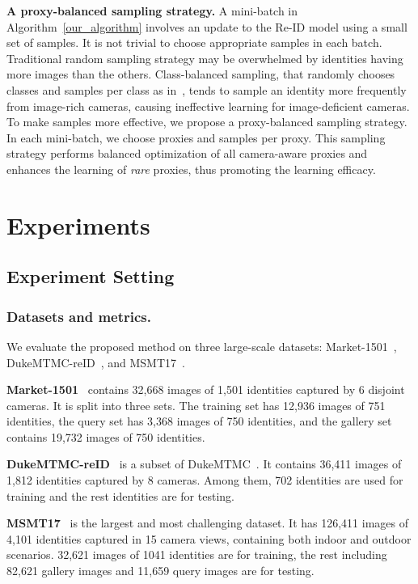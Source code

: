 \documentclass[letterpaper]{article} \usepackage{aaai21}  \usepackage{times}  \usepackage{helvet} \usepackage{courier}  \usepackage[hyphens]{url}  \usepackage{graphicx} \usepackage{subcaption}
\begin{document}
\textbf{A proxy-balanced sampling strategy.} A mini-batch in Algorithm~\ref{our_algorithm} involves an update to the Re-ID model using a small set of samples. It is not trivial to choose appropriate samples in each batch. Traditional random sampling strategy may be overwhelmed by identities having more images than the others. Class-balanced sampling, that randomly chooses  classes and  samples per class as in~\cite{hermans2017defense}, tends to sample an identity more frequently from image-rich cameras, causing ineffective learning for image-deficient cameras. To make samples more effective, we propose a proxy-balanced sampling strategy. In each mini-batch, we choose  proxies and  samples per proxy. This sampling strategy performs balanced optimization of all camera-aware proxies and enhances the learning of \textit{rare} proxies, thus promoting the learning efficacy.



\section{Experiments}
\subsection{Experiment Setting}
\subsubsection{Datasets and metrics.} 
We evaluate the proposed method on three large-scale datasets: Market-1501~\cite{7410490}, DukeMTMC-reID~\cite{zheng2017unlabeled}, and MSMT17~\cite{wei2018person}. 

\textbf{Market-1501}~\cite{7410490} contains 32,668 images of 1,501 identities captured by 6 disjoint cameras. It is split into three sets. The training set has 12,936 images of 751 identities, the query set has 3,368 images of 750 identities, and the gallery set contains 19,732 images of 750 identities. 

\textbf{DukeMTMC-reID}~\cite{zheng2017unlabeled} is a subset of DukeMTMC~\cite{ristani2016performance}. It contains 36,411 images of 1,812 identities captured by 8 cameras. Among them, 702 identities are used for training and the rest identities are for testing. 

\textbf{MSMT17}~\cite{wei2018person} is the largest and most challenging dataset. It has 126,411 images of 4,101 identities captured in 15 camera views, containing both indoor and outdoor scenarios. 32,621 images of 1041 identities are for training, the rest including 82,621 gallery images and 11,659 query images are for testing. 
\end{document}
